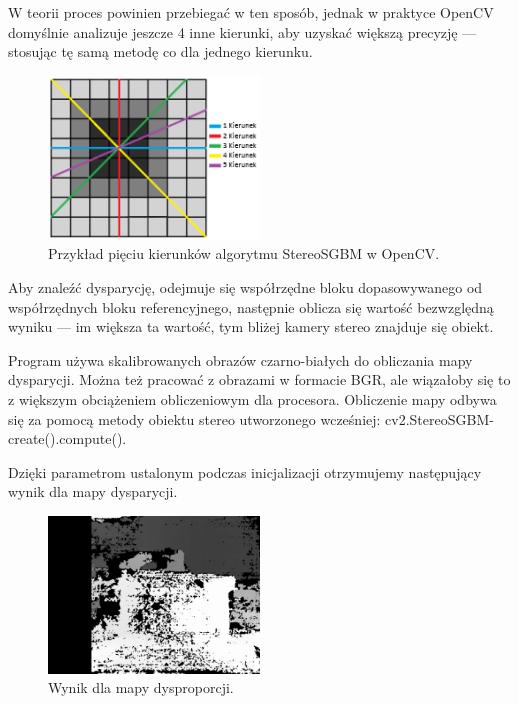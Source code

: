 \documentclass[magisterska]{pracadypl}
\begin{document}
W teorii proces powinien przebiegać w ten sposób, jednak w praktyce OpenCV domyślnie analizuje jeszcze 4 inne kierunki, aby uzyskać większą precyzję — stosując tę samą metodę co dla jednego kierunku.

\begin{figure}[H]  %
    \centering  %
    \includegraphics[width=0.5\textwidth]{images/dopracy2.png}  %
    \captionsetup{font=footnotesize}
    \caption[Przykład pięciu kierunków algorytmu StereoSGBM w OpenCV. Opracowanie własne. ]{Przykład pięciu kierunków algorytmu StereoSGBM w OpenCV.}
\end{figure}

Aby znaleźć dysparycję, odejmuje się współrzędne bloku dopasowywanego od współrzędnych bloku referencyjnego, następnie oblicza się wartość bezwzględną wyniku — im większa ta wartość, tym bliżej kamery stereo znajduje się obiekt.

Program używa skalibrowanych obrazów czarno-białych do obliczania mapy dysparycji. Można też pracować z obrazami w formacie BGR, ale wiązałoby się to z większym obciążeniem obliczeniowym dla procesora. Obliczenie mapy odbywa się za pomocą metody obiektu stereo utworzonego wcześniej: cv2.StereoSGBM-create().compute().

Dzięki parametrom ustalonym podczas inicjalizacji otrzymujemy następujący wynik dla mapy dysparycji.

\begin{figure}[H]  %
    \centering  %
    \includegraphics[width=0.5\textwidth]{images/dopracy3.png}  %
    \captionsetup{font=footnotesize}
    \caption[Wynik dla mapy dysproporcji. Opracowanie własne.]{Wynik dla mapy dysproporcji.}
\end{figure}
\end{document}
